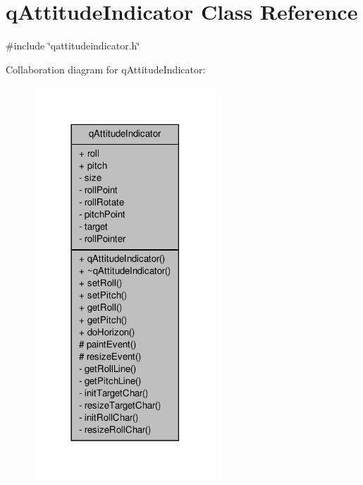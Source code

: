\hypertarget{classqAttitudeIndicator}{\section{q\-Attitude\-Indicator Class Reference}
\label{classqAttitudeIndicator}
}


{\ttfamily \#include \char`\"{}qattitudeindicator.\-h\char`\"{}}



Collaboration diagram for q\-Attitude\-Indicator\-:\nopagebreak
\begin{figure}[H]
\begin{center}
\leavevmode
\includegraphics[width=194pt]{classqAttitudeIndicator__coll__graph}
\end{center}
\end{figure}
